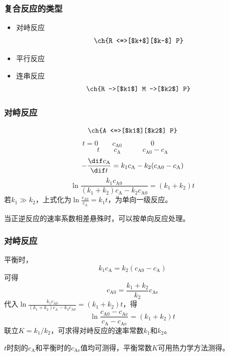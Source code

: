 \documentclass[dvipsnames, svgnames, x11names]{beamer}
\begin{document}
\begin{frame}
    \frametitle{复合反应的类型}

    \begin{itemize}
        \item 对峙反应
        \[
            \ch{R <=>[$k+$][$k-$] P}
        \]
        \item 平行反应
        
        \begin{center}
        \end{center}

        \item 连串反应
        \[
            \ch{R ->[$k1$] M ->[$k2$] P}
        \]
    \end{itemize}

\end{frame}


\begin{frame}
    \frametitle{对峙反应}

    \[
        \ch{A <=>[$k1$][$k2$] P}
    \]
    \[
        t = 0 \qquad c_\mathrm{A0} \qquad \qquad 0 \qquad \qquad 
    \]
    \[
        t \qquad c_\mathrm{A} \qquad \quad c_\mathrm{A0}-c_\mathrm{A} 
    \]
    \[
        - \frac{\dif c_\mathrm{A} }{\dif t} = k_1 c_\mathrm{A} - k_2 (c_\mathrm{A0} - c_\mathrm{A})
    \]
    \[
        \ln \frac{k_1 c_\mathrm{A0}}{(k_1+k_2)c_\mathrm{A} - k_2c_\mathrm{A0}} = (k_1+k_2)t
    \]
    若$k_1 \gg  k_2$，上式化为$\ln \frac{c_\mathrm{A0}}{c_\mathrm{A}} = k_1t$，为单向一级反应。

    当正逆反应的速率系数相差悬殊时，可以按单向反应处理。

\end{frame}


\begin{frame}
    \frametitle{对峙反应}

    平衡时，
    \[
        k_1 c_\mathrm{A} = k_2 (c_\mathrm{A0} - c_\mathrm{A})
    \]
    可得
    \[
        c_\mathrm{A0} = \frac{k_1 + k_2}{k_2}c_\mathrm{Ae}
    \]
    代入$\ln \frac{k_1 c_\mathrm{A0}}{(k_1+k_2)c_\mathrm{A} - k_2c_\mathrm{A0}} = (k_1+k_2)t$，得
    \[
        \ln \frac{c_\mathrm{A0}-c_\mathrm{Ae}}{c_\mathrm{A}-c_\mathrm{Ae}} = (k_1+k_2)t
    \]
    联立$K = k_1/k_2$，可求得对峙反应的速率常数$k_1$和$k_2$。

    $t$时刻的$c_\mathrm{A}$和平衡时的$c_\mathrm{Ae}$值均可测得，平衡常数$K$可用热力学方法测得。

\end{frame}
\end{document}
